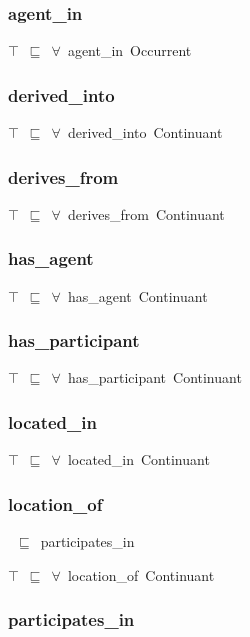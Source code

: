 \documentclass{article}
\begin{document}
\subsubsection*{agent_in}

\ensuremath{\top}~\ensuremath{\sqsubseteq}~\ensuremath{\forall}~agent\_in~Occurrent

\subsubsection*{derived_into}

\ensuremath{\top}~\ensuremath{\sqsubseteq}~\ensuremath{\forall}~derived\_into~Continuant

\subsubsection*{derives_from}

\ensuremath{\top}~\ensuremath{\sqsubseteq}~\ensuremath{\forall}~derives\_from~Continuant

\subsubsection*{has_agent}

\ensuremath{\top}~\ensuremath{\sqsubseteq}~\ensuremath{\forall}~has\_agent~Continuant

\subsubsection*{has_participant}

\ensuremath{\top}~\ensuremath{\sqsubseteq}~\ensuremath{\forall}~has\_participant~Continuant

\subsubsection*{located_in}

\ensuremath{\top}~\ensuremath{\sqsubseteq}~\ensuremath{\forall}~located\_in~Continuant

\subsubsection*{location_of}

~\ensuremath{\sqsubseteq}~participates\_in

\ensuremath{\top}~\ensuremath{\sqsubseteq}~\ensuremath{\forall}~location\_of~Continuant

\subsubsection*{participates_in}
\end{document}
